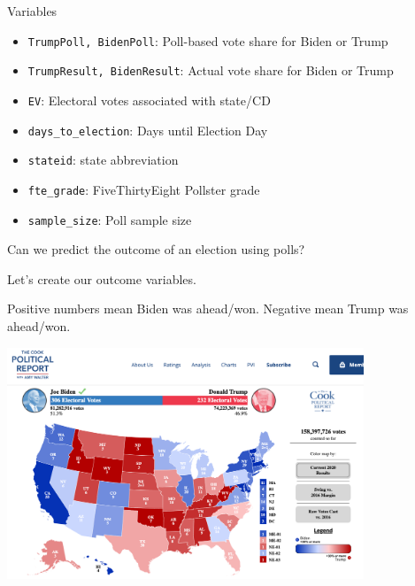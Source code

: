 \documentclass[
  letterpaper,
  DIV=11,
  numbers=noendperiod]{scrreprt}
\newenvironment{Shaded}{\begin{snugshade}}{\end{snugshade}}
\newcommand{\DocumentationTok}[1]{\textcolor[rgb]{0.37,0.37,0.37}{\textit{#1}}}
\newcommand{\NormalTok}[1]{\textcolor[rgb]{0.00,0.23,0.31}{#1}}
\newcommand{\OtherTok}[1]{\textcolor[rgb]{0.00,0.23,0.31}{#1}}
\newcommand{\SpecialCharTok}[1]{\textcolor[rgb]{0.37,0.37,0.37}{#1}}
\providecommand{\tightlist}{%
  \setlength{\itemsep}{0pt}\setlength{\parskip}{0pt}}\usepackage{longtable,booktabs,array}
\begin{document}
Variables

\begin{itemize}
\tightlist
\item
  \texttt{TrumpPoll,\ BidenPoll}: Poll-based vote share for Biden or
  Trump
\item
  \texttt{TrumpResult,\ BidenResult}: Actual vote share for Biden or
  Trump
\item
  \texttt{EV}: Electoral votes associated with state/CD
\item
  \texttt{days\_to\_election}: Days until Election Day
\item
  \texttt{stateid}: state abbreviation
\item
  \texttt{fte\_grade}: FiveThirtyEight Pollster grade
\item
  \texttt{sample\_size}: Poll sample size
\end{itemize}

Can we predict the outcome of an election using polls?

Let's create our outcome variables.

\begin{Shaded}
\end{Shaded}

Positive numbers mean Biden was ahead/won. Negative mean Trump was
ahead/won.

\includegraphics[width=0.8\textwidth,height=\textheight]{images/result2020.png}
\end{document}
